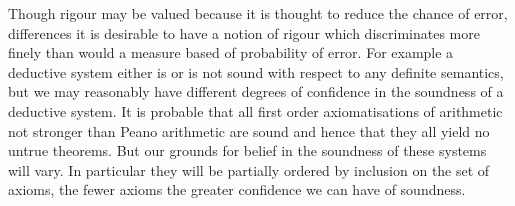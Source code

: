 \documentclass{rbjk}
\begin{document}
\begin{article}
Though rigour may be valued because it is thought to reduce the chance of error, differences it is desirable to have a notion of rigour which discriminates more finely than would a measure based of probability of error.
For example a deductive system either is or is not sound with respect to any definite semantics, but we may reasonably have different degrees of confidence in the soundness of a deductive system.
It is probable that all first order axiomatisations of arithmetic not stronger than Peano arithmetic are sound and hence that they all yield no untrue theorems.
But our grounds for belief in the soundness of these systems will vary.
In particular they will be partially ordered by inclusion on the set of axioms, the fewer axioms the greater confidence we can have of soundness.

%
%

\end{article}
\end{document}
